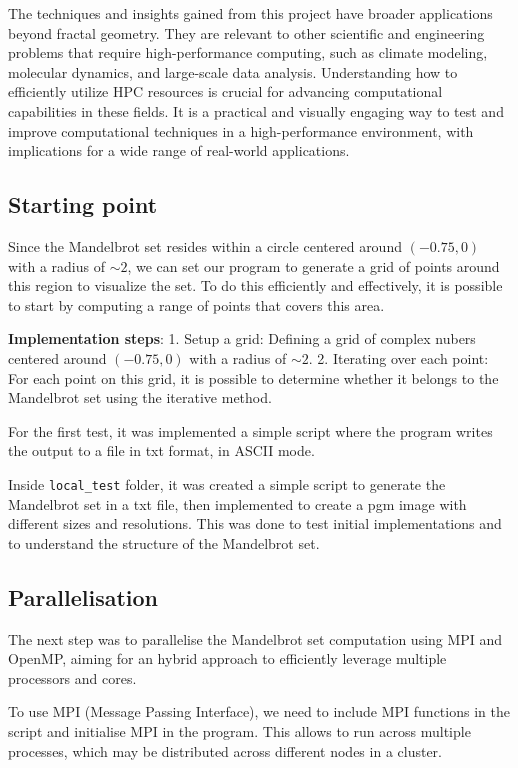 \documentclass[
]{article}
\begin{document}
The techniques and insights gained from this project have broader
applications beyond fractal geometry. They are relevant to other
scientific and engineering problems that require high-performance
computing, such as climate modeling, molecular dynamics, and large-scale
data analysis. Understanding how to efficiently utilize HPC resources is
crucial for advancing computational capabilities in these fields. It is
a practical and visually engaging way to test and improve computational
techniques in a high-performance environment, with implications for a
wide range of real-world applications.

\subsection{Starting point}\label{starting-point}

Since the Mandelbrot set resides within a circle centered around
\((-0.75, 0)\) with a radius of \(\sim 2\), we can set our program to
generate a grid of points around this region to visualize the set. To do
this efficiently and effectively, it is possible to start by computing a
range of points that covers this area.

\textbf{Implementation steps}: 1. Setup a grid: Defining a grid of
complex nubers centered around \((-0.75, 0)\) with a radius of
\(\sim 2\). 2. Iterating over each point: For each point on this grid,
it is possible to determine whether it belongs to the Mandelbrot set
using the iterative method.

For the first test, it was implemented a simple script where the program
writes the output to a file in txt format, in ASCII mode.

Inside \texttt{local\_test} folder, it was created a simple script to
generate the Mandelbrot set in a txt file, then implemented to create a
pgm image with different sizes and resolutions. This was done to test
initial implementations and to understand the structure of the
Mandelbrot set.

\subsection{Parallelisation}\label{parallelisation}

The next step was to parallelise the Mandelbrot set computation using
MPI and OpenMP, aiming for an hybrid approach to efficiently leverage
multiple processors and cores.

To use MPI (Message Passing Interface), we need to include MPI functions
in the script and initialise MPI in the program. This allows to run
across multiple processes, which may be distributed across different
nodes in a cluster.
\end{document}
